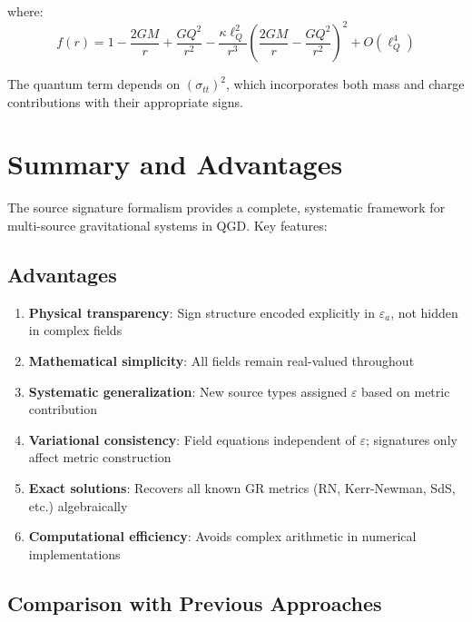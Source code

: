 \documentclass[11pt,a4paper]{article}
\theoremstyle{definition}
\theoremstyle{remark}
\begin{document}
	where:
	\begin{equation}
		f(r) = 1 - \frac{2GM}{r} + \frac{GQ^2}{r^2} - \frac{\kappa\ell_Q^2}{r^3}\left(\frac{2GM}{r} - \frac{GQ^2}{r^2}\right)^2 + O(\ell_Q^4)
	\end{equation}
	
	The quantum term depends on $(\sigma_{tt})^2$, which incorporates both mass and charge contributions with their appropriate signs.
	
	\section{Summary and Advantages}
	
	The source signature formalism provides a complete, systematic framework for multi-source gravitational systems in QGD. Key features:
	
	\subsection{Advantages}
	
	\begin{enumerate}
		\item \textbf{Physical transparency}: Sign structure encoded explicitly in $\varepsilon_a$, not hidden in complex fields
		\item \textbf{Mathematical simplicity}: All fields remain real-valued throughout
		\item \textbf{Systematic generalization}: New source types assigned $\varepsilon$ based on metric contribution
		\item \textbf{Variational consistency}: Field equations independent of $\varepsilon$; signatures only affect metric construction
		\item \textbf{Exact solutions}: Recovers all known GR metrics (RN, Kerr-Newman, SdS, etc.) algebraically
		\item \textbf{Computational efficiency}: Avoids complex arithmetic in numerical implementations
	\end{enumerate}
	
	\subsection{Comparison with Previous Approaches}
	
\end{document}
